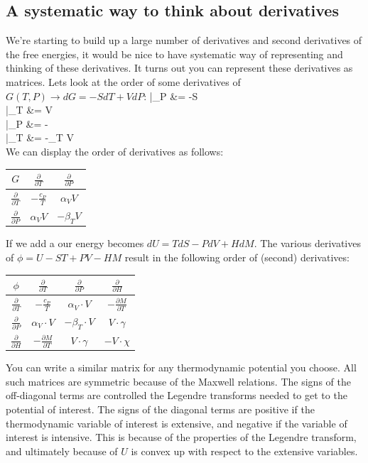 \documentclass[12pt]{article}
\begin{document}
\subsection{A systematic way to think about derivatives} \label{systematicWayDerivatives}
We're starting to build up a large number of derivatives and second derivatives of the free energies, it would be nice to have systematic way of representing and thinking of these derivatives. It turns out you can represent these derivatives as matrices. Lets look at the order of some derivatives of $G(T,P) \rightarrow dG = -S dT + V dP$:
\eqs
{}|_P &= -S\\
|_T &= V\\
|_P &= -\\
|_T &= -\beta_T V\\
\eqe
We can display the order of derivatives as follows:\\
\begin{center}
\begin{tabular}{c | c | c}
 $G$ & $\frac{\partial}{\partial T}$ & $\frac{\partial}{\partial P}$\\ \hline
 $\frac{\partial}{\partial T}$ & $-\frac{c_P}{T}$ & $\alpha_V V$\\ \hline
 $\frac{\partial}{\partial P}$ & $\alpha_V V$ & $-\beta_T V$
\end{tabular}
\end{center}
If we add a  our energy becomes $dU = TdS - PdV + H dM$.  The various derivatives of $\phi = U - ST + PV - HM$ result in the following order of (second) derivatives:
\begin{center}
\begin{tabular}{c | c | c | c}
$\phi$ & $\frac{\partial}{\partial T}$ & $\frac{\partial}{\partial P}$& $\frac{\partial}{\partial H}$\\ \hline
$\frac{\partial}{\partial T}$ & $-\frac{c_P}{T}$ & $\alpha_V \cdot V$ & $-\frac{\partial M}{\partial T}$\\ \hline
$\frac{\partial}{\partial P}$ & $\alpha_V \cdot V$ & $-\beta_T \cdot V$ & $V \cdot \gamma$\\ \hline
$\frac{\partial}{\partial H}$ & $-\frac{\partial M}{\partial T}$ & $V \cdot \gamma$ & $-V \cdot \chi$
\end{tabular}
\end{center}
You can write a similar matrix for any thermodynamic potential you choose. All such matrices are symmetric because of the Maxwell relations. The signs of the off-diagonal terms are controlled the Legendre transforms needed to get to the potential of interest. The signs of the diagonal terms are positive if the thermodynamic variable of interest is extensive, and negative if the variable of interest is intensive. This is because of the properties of the Legendre transform, and ultimately because of $U$ is convex up with respect to the extensive variables.
\end{document}
